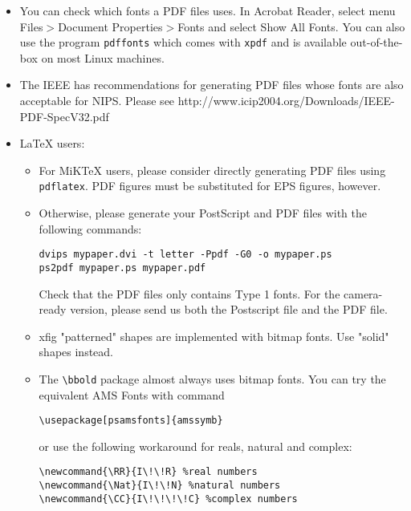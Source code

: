 \documentclass{article}
\theoremstyle{plain}
\begin{document}
\begin{itemize}

\item You can check which fonts a PDF files uses. In Acrobat Reader, select
menu Files$>$Document Properties$>$Fonts and select Show All Fonts. You can
also use the program \verb+pdffonts+ which comes with \verb+xpdf+ and is
available out-of-the-box on most Linux machines.

\item The IEEE has recommendations for generating PDF files whose fonts
are also acceptable for NIPS. Please see
http://www.icip2004.org/Downloads/IEEE-PDF-SpecV32.pdf

\item LaTeX users:

\begin{itemize}

\item For MiKTeX users, please consider directly generating PDF files using
\verb+pdflatex+. PDF figures must be substituted for EPS figures,
however.

\item Otherwise, please generate your PostScript and PDF files with the following commands:
\begin{verbatim} 
dvips mypaper.dvi -t letter -Ppdf -G0 -o mypaper.ps
ps2pdf mypaper.ps mypaper.pdf
\end{verbatim}

Check that the PDF files only contains Type 1 fonts. For the camera-ready version, please send us both the Postscript file and the PDF file.

\item xfig "patterned" shapes are implemented with 
bitmap fonts.  Use "solid" shapes instead. 
\item The \verb+\bbold+ package almost always uses bitmap
fonts.  You can try the equivalent AMS Fonts with command
\begin{verbatim}
\usepackage[psamsfonts]{amssymb}
\end{verbatim}
 or use the following workaround for reals, natural and complex: 
\begin{verbatim}
\newcommand{\RR}{I\!\!R} %real numbers
\newcommand{\Nat}{I\!\!N} %natural numbers 
\newcommand{\CC}{I\!\!\!\!C} %complex numbers
\end{verbatim}


\end{itemize}
\end{itemize}
\end{document}
